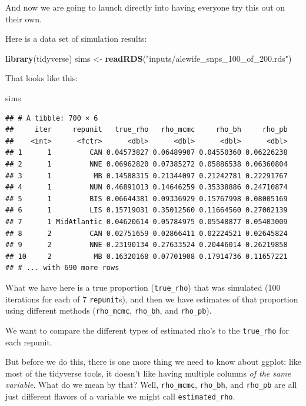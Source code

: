 \documentclass[]{book}
\newenvironment{Shaded}{\begin{snugshade}}{\end{snugshade}}
\newcommand{\KeywordTok}[1]{\textcolor[rgb]{0.13,0.29,0.53}{\textbf{{#1}}}}
\newcommand{\StringTok}[1]{\textcolor[rgb]{0.31,0.60,0.02}{{#1}}}
\newcommand{\NormalTok}[1]{{#1}}
\theoremstyle{definition}
\theoremstyle{definition}
\theoremstyle{remark}
\begin{document}
And now we are going to launch directly into having everyone try this
out on their own.

Here is a data set of simulation results:

\begin{Shaded}
\begin{Highlighting}[]
\KeywordTok{library}\NormalTok{(tidyverse)}
\NormalTok{sims <-}\StringTok{ }\KeywordTok{readRDS}\NormalTok{(}\StringTok{"inputs/alewife_snps_100_of_200.rds"}\NormalTok{)}
\end{Highlighting}
\end{Shaded}

That looks like this:

\begin{Shaded}
\begin{Highlighting}[]
\NormalTok{sims}
\end{Highlighting}
\end{Shaded}

\begin{verbatim}
## # A tibble: 700 × 6
##     iter     repunit   true_rho   rho_mcmc     rho_bh     rho_pb
##    <int>      <fctr>      <dbl>      <dbl>      <dbl>      <dbl>
## 1      1         CAN 0.04573827 0.06489907 0.04550360 0.06226238
## 2      1         NNE 0.06962820 0.07385272 0.05886538 0.06360804
## 3      1          MB 0.14588315 0.21344097 0.21242781 0.22291767
## 4      1         NUN 0.46891013 0.14646259 0.35338886 0.24710874
## 5      1         BIS 0.06644381 0.09336929 0.15767998 0.08005169
## 6      1         LIS 0.15719031 0.35012560 0.11664560 0.27002139
## 7      1 MidAtlantic 0.04620614 0.05784975 0.05548877 0.05403009
## 8      2         CAN 0.02751659 0.02866411 0.02224521 0.02645824
## 9      2         NNE 0.23190134 0.27633524 0.20446014 0.26219858
## 10     2          MB 0.16320168 0.07701908 0.17914736 0.11657221
## # ... with 690 more rows
\end{verbatim}

What we have here is a true proportion (\texttt{true\_rho}) that was
simulated (100 iterations for each of 7 \texttt{repunit}s), and then we
have estimates of that proportion using different methods
(\texttt{rho\_mcmc}, \texttt{rho\_bh}, and \texttt{rho\_pb}).

We want to compare the different types of estimated rho's to the
\texttt{true\_rho} for each repunit.

But before we do this, there is one more thing we need to know about
ggplot: like most of the tidyverse tools, it doesn't like having
multiple columns \emph{of the same variable}. What do we mean by that?
Well, \texttt{rho\_mcmc}, \texttt{rho\_bh}, and \texttt{rho\_pb} are all
just different flavors of a variable we might call
\texttt{estimated\_rho}.
\end{document}

